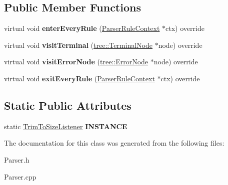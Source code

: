 \subsection*{Public Member Functions}
\begin{DoxyCompactItemize}
\item 
\mbox{\label{classantlr4_1_1Parser_1_1TrimToSizeListener_a00e6664da91345112f34c64094bf8c47}} 
virtual void {\bfseries enter\+Every\+Rule} (\hyperlink{classantlr4_1_1ParserRuleContext}{Parser\+Rule\+Context} $\ast$ctx) override
\item 
\mbox{\label{classantlr4_1_1Parser_1_1TrimToSizeListener_ad33db64f585fb023cde9c565e2e4d55a}} 
virtual void {\bfseries visit\+Terminal} (\hyperlink{classantlr4_1_1tree_1_1TerminalNode}{tree\+::\+Terminal\+Node} $\ast$node) override
\item 
\mbox{\label{classantlr4_1_1Parser_1_1TrimToSizeListener_af105e89f1ef9a10df676966cffcf2e17}} 
virtual void {\bfseries visit\+Error\+Node} (\hyperlink{classantlr4_1_1tree_1_1ErrorNode}{tree\+::\+Error\+Node} $\ast$node) override
\item 
\mbox{\label{classantlr4_1_1Parser_1_1TrimToSizeListener_af66d09036b8058345a9f87882126f82c}} 
virtual void {\bfseries exit\+Every\+Rule} (\hyperlink{classantlr4_1_1ParserRuleContext}{Parser\+Rule\+Context} $\ast$ctx) override
\end{DoxyCompactItemize}
\subsection*{Static Public Attributes}
\begin{DoxyCompactItemize}
\item 
\mbox{\label{classantlr4_1_1Parser_1_1TrimToSizeListener_a46fad9be0cc80e02b01d4f7a24eb4ddb}} 
static \hyperlink{classantlr4_1_1Parser_1_1TrimToSizeListener}{Trim\+To\+Size\+Listener} {\bfseries I\+N\+S\+T\+A\+N\+CE}
\end{DoxyCompactItemize}


The documentation for this class was generated from the following files\+:\begin{DoxyCompactItemize}
\item 
Parser.\+h\item 
Parser.\+cpp\end{DoxyCompactItemize}
